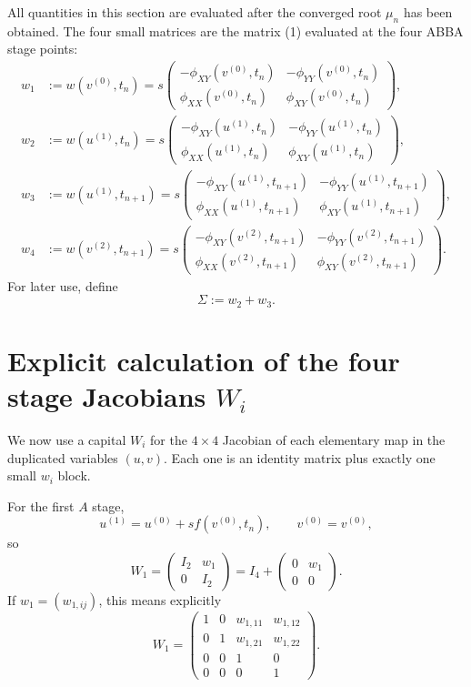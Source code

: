 \documentclass[11pt,a4paper]{article}
\begin{document}
All quantities in this section are evaluated after the converged root $\mu_n$ has been
obtained. The four small matrices are the matrix (1) evaluated at the four ABBA stage
points:
\begin{align}
 w_1&:=w(v^{(0)},t_n)
 =s\begin{pmatrix}
 -\phi_{XY}(v^{(0)},t_n)&-\phi_{YY}(v^{(0)},t_n)\\
 \phi_{XX}(v^{(0)},t_n)&\phi_{XY}(v^{(0)},t_n)
 \end{pmatrix}, \tag{5a}\\[2mm]
 w_2&:=w(u^{(1)},t_n)
 =s\begin{pmatrix}
 -\phi_{XY}(u^{(1)},t_n)&-\phi_{YY}(u^{(1)},t_n)\\
 \phi_{XX}(u^{(1)},t_n)&\phi_{XY}(u^{(1)},t_n)
 \end{pmatrix}, \tag{5b}\\[2mm]
 w_3&:=w(u^{(1)},t_{n+1})
 =s\begin{pmatrix}
 -\phi_{XY}(u^{(1)},t_{n+1})&-\phi_{YY}(u^{(1)},t_{n+1})\\
 \phi_{XX}(u^{(1)},t_{n+1})&\phi_{XY}(u^{(1)},t_{n+1})
 \end{pmatrix}, \tag{5c}\\[2mm]
 w_4&:=w(v^{(2)},t_{n+1})
 =s\begin{pmatrix}
 -\phi_{XY}(v^{(2)},t_{n+1})&-\phi_{YY}(v^{(2)},t_{n+1})\\
 \phi_{XX}(v^{(2)},t_{n+1})&\phi_{XY}(v^{(2)},t_{n+1})
 \end{pmatrix}. \tag{5d}
\end{align}
For later use, define
\[
 \Sigma:=w_2+w_3.
 \tag{6}
\]

\section{Explicit calculation of the four stage Jacobians \texorpdfstring{$W_i$}{Wi}}

We now use a capital $W_i$ for the $4\times4$ Jacobian of each elementary map in the
duplicated variables $(u,v)$. Each one is an identity matrix plus exactly one small
$w_i$ block.

For the first $A$ stage,
\[
 u^{(1)}=u^{(0)}+s f(v^{(0)},t_n),
 \qquad
 v^{(0)}=v^{(0)},
\]
so
\[
 \boxed{
 W_1=
 \begin{pmatrix}
 I_2&w_1\\
 0&I_2
 \end{pmatrix}
 =I_4+
 \begin{pmatrix}
 0&w_1\\
 0&0
 \end{pmatrix}.
 }
 \tag{7a}
\]
If $w_1=(w_{1,ij})$, this means explicitly
\[
 W_1=
 \begin{pmatrix}
 1&0&w_{1,11}&w_{1,12}\\
 0&1&w_{1,21}&w_{1,22}\\
 0&0&1&0\\
 0&0&0&1
 \end{pmatrix}.
\]
\end{document}
